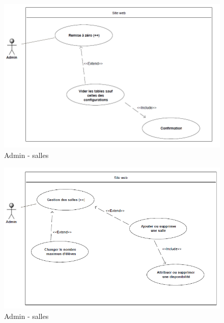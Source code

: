     \begin{figure}[h]
        \begin{center}
            \includegraphics[scale=0.50]{images/uml/adminRAZ.png} 
        \end{center}

        \caption{Admin - salles}
        \label{Admin - salles}
    \end{figure}

    \begin{figure}[h]
        \begin{center}
            \includegraphics[scale=0.50]{images/uml/adminSalles.png} 
        \end{center}

        \caption{Admin - salles}
        \label{Admin - salles}
    \end{figure}

